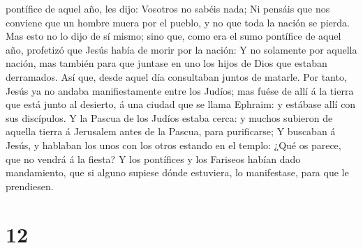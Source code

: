 pontífice de aquel año, les dijo: Vosotros no sabéis nada;
 Ni pensáis que nos conviene que un hombre muera por el
pueblo, y no que toda la nación se pierda.  Mas esto no
lo dijo de sí mismo; sino que, como era el sumo pontífice de aquel año,
profetizó que Jesús había de morir por la nación:  Y no
solamente por aquella nación, mas también para que juntase en uno los
hijos de Dios que estaban derramados.  Así que, desde
aquel día consultaban juntos de matarle.  Por tanto,
Jesús ya no andaba manifiestamente entre los Judíos; mas fuése de allí á
la tierra que está junto al desierto, á una ciudad que se llama Ephraim:
y estábase allí con sus discípulos.  Y la Pascua de los
Judíos estaba cerca: y muchos subieron de aquella tierra á Jerusalem
antes de la Pascua, para purificarse;  Y buscaban á
Jesús, y hablaban los unos con los otros estando en el templo: ¿Qué os
parece, que no vendrá á la fiesta?  Y los pontífices y
los Fariseos habían dado mandamiento, que si alguno supiese dónde
estuviera, lo manifestase, para que le prendiesen.

\hypertarget{section-11}{%
\section{12}\label{section-11}}

